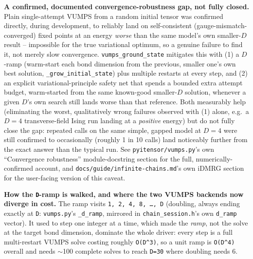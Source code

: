 \documentclass[11pt]{article}
\begin{document}
\textbf{A confirmed, documented convergence-robustness gap, not fully
closed.} Plain single-attempt VUMPS from a random initial tensor was
confirmed directly, during development, to reliably land on
self-consistent (gauge-mismatch-converged) fixed points at an energy
\emph{worse} than the same model's own smaller-$D$ result -- impossible
for the true variational optimum, so a genuine failure to find it, not
merely slow convergence. \texttt{vumps\_ground\_state} mitigates this
with (1) a $D$-ramp (warm-start each bond dimension from the previous,
smaller one's own best solution, \texttt{\_grow\_initial\_state}) plus
multiple restarts at every step, and (2) an explicit
variational-principle safety net that spends a bounded extra attempt
budget, warm-started from the same known-good smaller-$D$ solution,
whenever a given $D$'s own search still lands worse than that
reference. Both measurably help (eliminating the worst, qualitatively
wrong failures observed with (1) alone, e.g.\ a $D=4$ transverse-field
Ising run landing at a \emph{positive} energy) but do not fully close
the gap: repeated calls on the same simple, gapped model at $D=4$ were
still confirmed to occasionally (roughly 1 in 10 calls) land noticeably
further from the exact answer than the typical run. See
\texttt{pyitensor/vumps.py}'s own ``Convergence robustness''
module-docstring section for the full, numerically-confirmed account,
and \texttt{docs/guide/infinite-chains.md}'s own iDMRG section for the
user-facing version of this caveat.

\textbf{How the \texttt{D}-ramp is walked, and where the two VUMPS
backends now diverge in cost.} The ramp visits
\texttt{1, 2, 4, 8, \ldots, D} (doubling, always ending exactly at
\texttt{D}: \texttt{vumps.py}'s \texttt{\_d\_ramp}, mirrored in
\texttt{chain\_session.h}'s own \texttt{d\_ramp} vector). It used to step
one integer at a time, which made the \emph{ramp}, not the solve at the
target bond dimension, dominate the whole driver: every step is a full
multi-restart VUMPS solve costing roughly \texttt{O(D\^{}3)}, so a unit
ramp is \texttt{O(D\^{}4)} overall and needs $\sim$100 complete solves to
reach \texttt{D=30} where doubling needs 6. 
\end{document}
